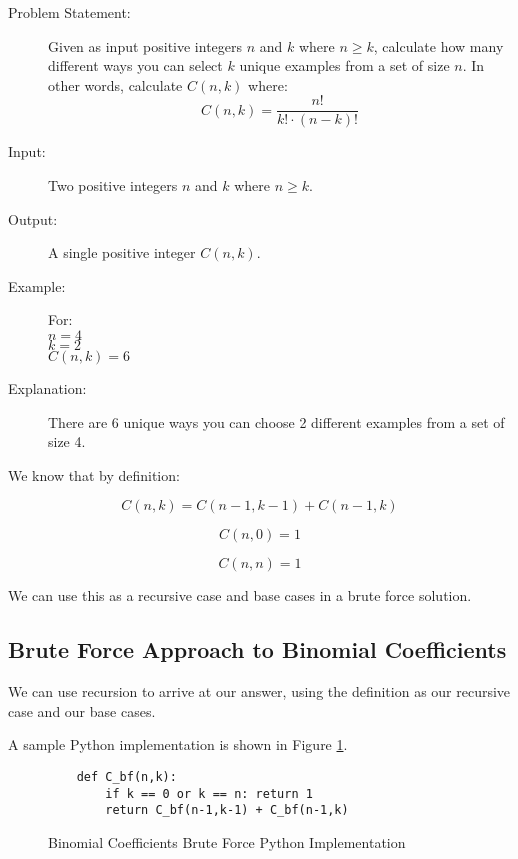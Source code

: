 \begin{description}
    \item[Problem Statement:]
        Given as input positive integers $n$ and $k$ where $n \geq k$, calculate how many different ways you can select $k$ unique examples from a set of size $n$.
        In other words, calculate $C(n,k)$ where: \[
            C(n,k) = \frac{n!}{k! \cdot (n-k)!}
            \]

    \item[Input:] 
        Two positive integers $n$ and $k$ where $n \geq k$.
        
    \item[Output:]
        A single positive integer $C(n,k)$.
        
    \item[Example:] For:\\
        $n = 4$\\
        $k = 2$\\
        $C(n,k) = 6$

    \item[Explanation:]
        There are 6 unique ways you can choose 2 different examples from a set of size 4.
        
\end{description}

We know that by definition:

$$C(n,k) = C(n-1,k-1) + C(n-1,k)$$

$$C(n,0) = 1$$

$$C(n,n) = 1$$

We can use this as a recursive case and base cases in a brute force solution.

\subsection{Brute Force Approach to Binomial Coefficients}
We can use recursion to arrive at our answer, using the definition as our recursive case and our base cases.

A sample Python implementation is shown in Figure \ref{fig:binomial-bf}.

\begin{figure}[H]
    \centering
    \begin{lstlisting}
    def C_bf(n,k):
        if k == 0 or k == n: return 1
        return C_bf(n-1,k-1) + C_bf(n-1,k)
    \end{lstlisting}
    \caption{Binomial Coefficients Brute Force Python Implementation}
    \label{fig:binomial-bf}
\end{figure}

